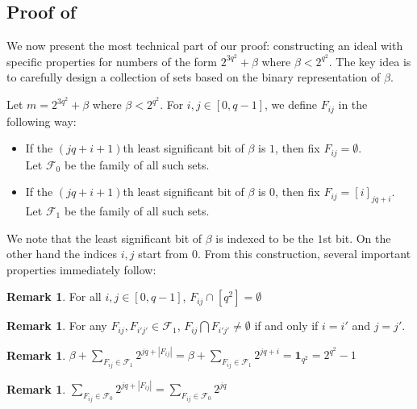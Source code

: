 \documentclass[11pt,a4paper]{article}
\theoremstyle{definition}
\newtheorem{remark}[theorem]{Remark}
\begin{document}
\subsection{Proof of \texorpdfstring{}
	{Theorem \ref{thm:basecase_recursion}}}
\label{subsec:proofthm11}

We now present the most technical part of our proof: constructing an ideal 
with specific properties for numbers of the form $2^{3q^2}+\beta$ where 
$\beta < 2^{q^2}$. The key idea is to carefully design a collection of sets 
based on the binary representation of $\beta$.

Let $m=2^{3q^2}+\beta$ where $\beta < 2^{q^2}$. For $i,j \in [0,q-1]$, we 
define $F_{ij}$ in the following way: 
\begin{itemize}
	\item If the $(jq+i+1)$th least significant bit of $\beta$ is $1$, then 
	fix $F_{ij}=\emptyset$. \\ Let $\mathcal{F}_0$ be the family of all such 
	sets.
	\item If the $(jq+i+1)$th least significant bit of $\beta$ is $0$, then 
	fix $F_{ij}=[i]_{jq+i}$. \\ Let $\mathcal{F}_1$ be the family of all such 
	sets.
\end{itemize}
We note that the least significant bit of $\beta$ is indexed to be the $1$st bit. On the other hand the indices $i,j$ start from $0$. From this construction, several important properties immediately follow:

\begin{remark}\label{fij_disj2}
	For all $i,j \in [0,q-1]$, $F_{ij} \cap [q^2]=\emptyset$    
\end{remark}

\begin{remark}\label{fij_disj}
	For any $F_{ij},F_{i'j'} \in \mathcal{F}_1$, $F_{ij}\bigcap F_{i'j'} \neq 
	\emptyset$ if and only if $i=i'$ and $j=j'$.   
\end{remark}

\begin{remark}\label{rem:beta1}
	$\beta+ \sum\limits_{F_{ij}\in \mathcal{F}_1} 2^{jq+|F_{ij}|} =\beta+
	\sum\limits_{F_{ij}\in \mathcal{F}_1} 2^{jq+i} = \mathbf{1}_{{q^2}} = 
	2^{q^2}-1$
\end{remark}

\begin{remark}\label{rem:beta2}
	$\sum\limits_{F_{ij}\in \mathcal{F}_0} 2^{jq+|F_{ij}|} =\sum\limits_{F_{ij}
		\in \mathcal{F}_0} 2^{jq} $
\end{remark}
\end{document}
